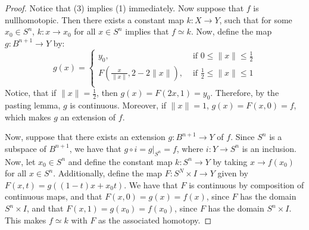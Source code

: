 \begin{proof}
    Notice that (3) implies (1) immediately. Now suppose that $f$ is
    nullhomotopic. Then there exists a constant map  $k:X \xrightarrow{} Y$,
    such that for some $x_0 \in S^n$, $k:x \xrightarrow{} x_0$ for all $x \in
    S^n$ implies that  $f \simeq k$. Now, define the map  $g:B^{n+1}
    \xrightarrow{} Y$ by:
    \begin{equation*}
     g(x)=\begin{cases}
            y_0,    &   \text{ if } 0 \leq \|x\| \leq \frac{1}{2} \\
            F(\frac{x}{\|x\|},2-2\|x\|), & \text{ if } \frac{1}{2} \leq \|x\| \leq 1 \\
        \end{cases}
    \end{equation*}
    Notice, that if $\|x\|=\frac{1}{2}$, then $g(x)=F(2x,1)=y_0$. Therefore, by
    the pasting lemma, $g$ is continuous. Moreover, if  $\|x\|=1$,
    $g(x)=F(x,0)=f$, which makes $g$ an extension of  $f$.

    Now, suppose that there exists an extension  $g:B^{n+1} \xrightarrow{} Y$ of
    $f$. Since  $S^n$ is a subspace of  $B^{n+1}$, we have that $g \circ
    i=g|_{S^n}=f$, where $i:Y \xrightarrow{} S^n$ is an inclusion. Now, let $x_0
    \in S^n$ and define the constant map $k:S^n \xrightarrow{} Y$ by taking $x
    \xrightarrow{} f(x_0)$ for all $x \in S^n$. Additionally, define the map
    $F:S^N \times I \xrightarrow{} Y$ given by $F(x,t)=g((1-t)x+x_0t)$. We have
    that $F$ is continuous by composition of continuous maps, and that
    $F(x,0)=g(x)=f(x)$, since $F$ has the domain  $S^n \times I$, and that
    $F(x,1)=g(x_0)=f(x_0)$, since $F$ has the domain  $S^n \times I$. This makes
     $f \simeq k$ with $F$ as the associated homotopy.
\end{proof}
